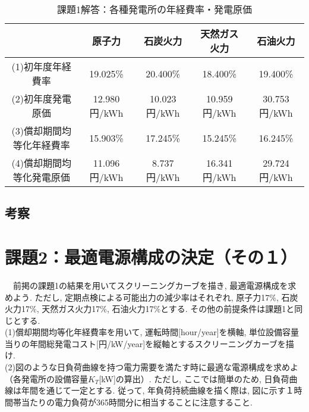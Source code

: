 \documentclass[]{jsarticle}
\begin{document}
        \begin{table}[htb]
          \begin{center}
            \caption{課題1解答：各種発電所の年経費率・発電原価}
            \begin{tabular}{|c|c|c|c|c|} \hline
                  　     & 原子力 & 石炭火力 & 天然ガス火力 & 石油火力 \\ \hline
              (1)初年度年経費率 & 19.025\% & 20.400\% & 18.400\% & 19.400\% \\ \hline
              (2)初年度発電原価 & 12.980円/kWh & 10.023円/kWh & 10.959円/kWh & 30.753円/kWh \\ \hline
              (3)償却期間均等化年経費率 & 15.903\% & 17.245\% & 15.245\% & 16.245\% \\ \hline
              (4)償却期間均等化発電原価 & 11.096円/kWh & 8.737円/kWh & 16.341円/kWh & 29.724円/kWh \\ \hline
            \end{tabular}
            \label{ans1}
          \end{center}
        \end{table}


    \subsection{考察}


  \section{課題2：最適電源構成の決定（その１）\label{task2}}
    \begin{screen}
      　前掲の課題1の結果を用いてスクリーニングカーブを描き, 最適電源構成を求めよう. ただし, 定期点検による可能出力の減少率はそれぞれ, 原子力17\%, 石炭火力17\%, 天然ガス火力17\%, 石油火力17\%とする. その他の前提条件は課題1と同じとする.\\
      (1)償却期間均等化年経費率を用いて, 運転時間[hour/year]を横軸, 単位設備容量当りの年間総発電コスト[円/kW/year]を縦軸とするスクリーニングカーブを描け. \\
      (2)図のような日負荷曲線を持つ電力需要を満たす時に最適な電源構成を求めよ（各発電所の設備容量$K_T$[kW]の算出）. ただし, ここでは簡単のため, 日負荷曲線は年間を通じて一定とする. 従って, 年負荷持続曲線を描く際は, 図に示す１時間帯当たりの電力負荷が365時間分に相当することに注意すること.
    \end{screen}
\end{document}
